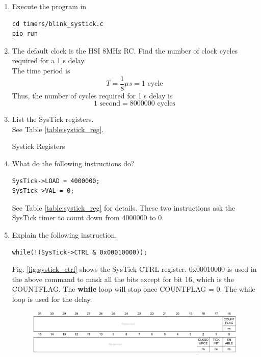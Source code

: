 \documentclass[journal,12pt,twocolumn]{IEEEtran}
\renewcommand\thesection{\arabic{section}}
\renewcommand\thesubsection{\thesection.\arabic{subsection}}
\begin{document}
\begin{enumerate}[label=\thesubsection.\arabic*.,ref=\thesubsection.\theenumi]
\item Execute the program in 
\begin{lstlisting}
cd timers/blink_systick.c
pio run
\end{lstlisting}
\item The default clock is the HSI 8MHz RC.  Find the number of clock cycles required for a 1 s delay.
\\
\solution The time period is
\begin{equation}
T = \frac{1}{8}\mu s = 1 \text{ cycle}
\end{equation}
Thus, the number of cycles required for 1 s delay is
\begin{equation}
1 \text{ second} = 8000000 \text{ cycles}
\end{equation}
\item List the SysTick registers.
\\
\solution See Table \ref{table:systick_reg}.
\begin{table}[!ht]
\footnotesize
\centering

\caption{Systick Registers}
\label{table:systick_reg}
\end{table}
\item What do the following instructions do?
\begin{lstlisting}
SysTick->LOAD = 4000000;
SysTick->VAL = 0;
\end{lstlisting}
\solution See Table \ref{table:systick_reg} for details.  These two instructions ask the SysTick timer to count down from 4000000 to 0.  
\item Explain the following instruction.
\begin{lstlisting}
while(!(SysTick->CTRL & 0x00010000));
\end{lstlisting}
\solution Fig. \ref{fig:systick_ctrl} shows the SysTick CTRL register.    0x00010000 is used in the above command to mask all the bits except for bit 16, which
is the COUNTFLAG.  The \textbf{while} loop will stop once COUNTFLAG = 0. The while loop is used for the delay.
\begin{figure}[!ht]
\begin{center}
\includegraphics[width=\columnwidth]{./stm32/timers/figs/systick_ctrl.eps}
\end{center}

\end{figure}
\end{enumerate}
\end{document}
